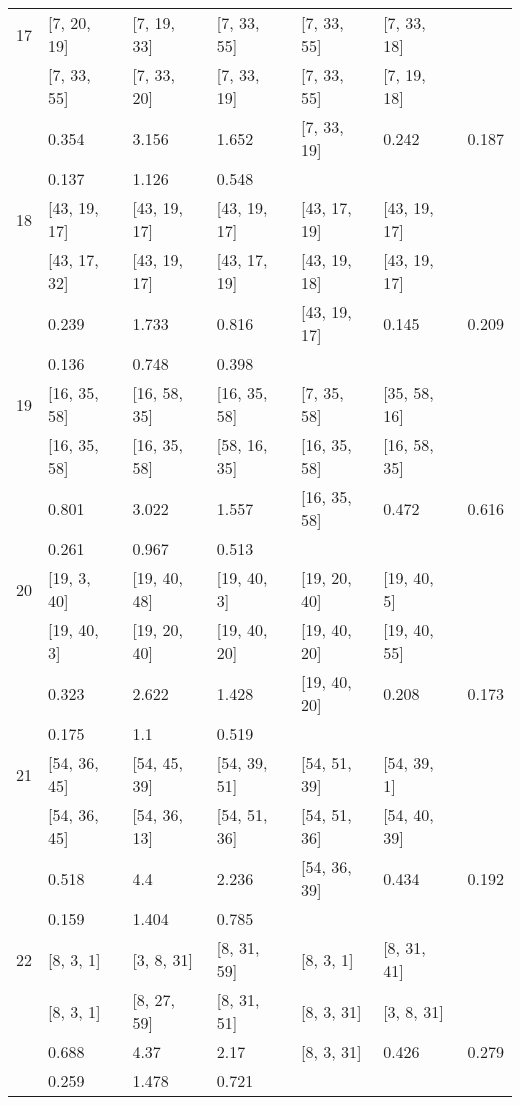 \begin{longtable}{| l || l | l | l | l | l | l | }
\hline
17  & [7, 20, 19] & [7, 19, 33] & [7, 33, 55] & [7, 33, 55] & [7, 33, 18] \\
 & [7, 33, 55] & [7, 33, 20] & [7, 33, 19] & [7, 33, 55] & [7, 19, 18]\\
\hline
& 0.354 & 3.156 & 1.652 & [7, 33, 19] & 0.242 & 0.187\\
\hline
& 0.137 & 1.126 & 0.548 \\
\hline

\hline
18  & [43, 19, 17] & [43, 19, 17] & [43, 19, 17] & [43, 17, 19] & [43, 19, 17] \\
 & [43, 17, 32] & [43, 19, 17] & [43, 17, 19] & [43, 19, 18] & [43, 19, 17]\\
\hline
& 0.239 & 1.733 & 0.816 & [43, 19, 17] & 0.145 & 0.209\\
\hline
& 0.136 & 0.748 & 0.398 \\
\hline

\hline
19  & [16, 35, 58] & [16, 58, 35] & [16, 35, 58] & [7, 35, 58] & [35, 58, 16] \\
 & [16, 35, 58] & [16, 35, 58] & [58, 16, 35] & [16, 35, 58] & [16, 58, 35]\\
\hline
& 0.801 & 3.022 & 1.557 & [16, 35, 58] & 0.472 & 0.616\\
\hline
& 0.261 & 0.967 & 0.513 \\
\hline

\hline
20  & [19, 3, 40] & [19, 40, 48] & [19, 40, 3] & [19, 20, 40] & [19, 40, 5] \\
 & [19, 40, 3] & [19, 20, 40] & [19, 40, 20] & [19, 40, 20] & [19, 40, 55]\\
\hline
& 0.323 & 2.622 & 1.428 & [19, 40, 20] & 0.208 & 0.173\\
\hline
& 0.175 & 1.1 & 0.519 \\
\hline

\hline
21  & [54, 36, 45] & [54, 45, 39] & [54, 39, 51] & [54, 51, 39] & [54, 39, 1] \\
 & [54, 36, 45] & [54, 36, 13] & [54, 51, 36] & [54, 51, 36] & [54, 40, 39]\\
\hline
& 0.518 & 4.4 & 2.236 & [54, 36, 39] & 0.434 & 0.192\\
\hline
& 0.159 & 1.404 & 0.785 \\
\hline

\hline
22  & [8, 3, 1] & [3, 8, 31] & [8, 31, 59] & [8, 3, 1] & [8, 31, 41] \\
 & [8, 3, 1] & [8, 27, 59] & [8, 31, 51] & [8, 3, 31] & [3, 8, 31]\\
\hline
& 0.688 & 4.37 & 2.17 & [8, 3, 31] & 0.426 & 0.279\\
\hline
& 0.259 & 1.478 & 0.721 \\
\hline


\end{longtable}
